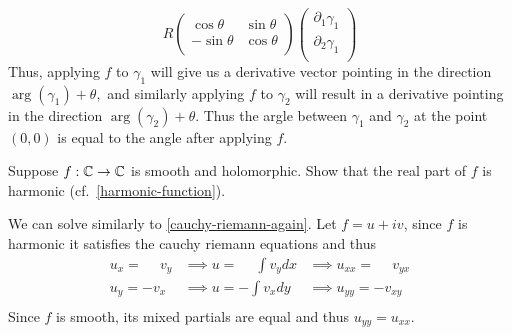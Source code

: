 \documentclass{homework}
\begin{document}
\begin{solution}
\[                                                             R
                                                             \begin{pmatrix}
                                                             \cos{\theta} & \sin{\theta}\\
                                                             -\sin{\theta} & \cos{\theta}\\
                                                             \end{pmatrix}
                                                             \begin{pmatrix}
                                                             \partial_1\gamma_1\\
                                                             \partial_2\gamma_1\\
                                                             \end{pmatrix}
                                                             \]
                                                             Thus, applying $f$ to $\gamma_1$ will give us a derivative vector pointing in the direction $\arg(\gamma_1) + \theta,$ and similarly applying $f$ to $\gamma_2$ will result in a derivative pointing in the direction $\arg(\gamma_2)+\theta$. Thus the argle between $\gamma_1$ and $\gamma_2$ at the point $(0,0)$ is equal to the angle after applying $f$.
                                                             \end{solution}
                                                             \begin{problem}
                                                               Suppose $f : \mathbb{C} \to \mathbb{C}$ is smooth and holomorphic.  Show that the
                                                                 real part of $f$ is harmonic (cf.~\ref{harmonic-function}).
                                                                 \end{problem}
                                                                 \begin{solution}
                                                                 We can solve similarly to \ref{cauchy-riemann-again}. Let $f=u+iv$, since $f$ is harmonic it satisfies the cauchy riemann equations and thus
                                                                 \begin{align*}
                                                                 u_x=\phantom{-}v_y &\implies u = \phantom{-}\int v_y dx &\implies u_{xx} = \phantom{-}v_{yx}\\
                                                                 u_y=-v_x &\implies u = -\int v_x dy &\implies u_{yy} = -v_{xy}\\
                                                                 \end{align*}
                                                                 Since $f$ is smooth, its mixed partials are equal and thus $u_{yy}=u_{xx}$.
                                                                 \end{solution}
\end{document}
